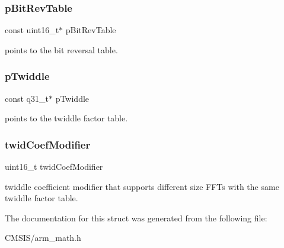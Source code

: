\subsubsection{\texorpdfstring{pBitRevTable}{pBitRevTable}}
{\footnotesize\ttfamily const uint16\+\_\+t$\ast$ p\+Bit\+Rev\+Table}

points to the bit reversal table. \mbox{\label{structarm__cfft__radix4__instance__q31_a9760c603af5d85652496dbffd63a8a2e}} 
\subsubsection{\texorpdfstring{pTwiddle}{pTwiddle}}
{\footnotesize\ttfamily const q31\+\_\+t$\ast$ p\+Twiddle}

points to the twiddle factor table. \mbox{\label{structarm__cfft__radix4__instance__q31_afe772e5b5001c9d8e85032115a8df5bf}} 
\subsubsection{\texorpdfstring{twidCoefModifier}{twidCoefModifier}}
{\footnotesize\ttfamily uint16\+\_\+t twid\+Coef\+Modifier}

twiddle coefficient modifier that supports different size F\+F\+Ts with the same twiddle factor table. 

The documentation for this struct was generated from the following file\+:\begin{DoxyCompactItemize}
\item 
C\+M\+S\+I\+S/arm\+\_\+math.\+h\end{DoxyCompactItemize}

